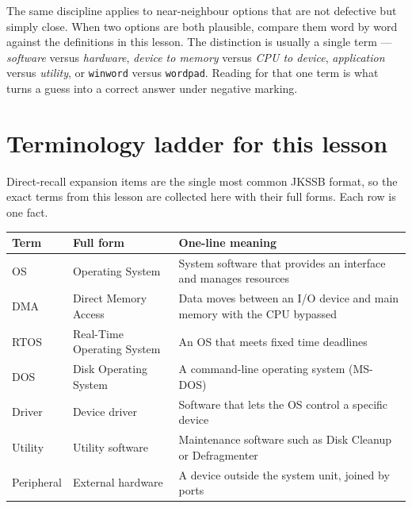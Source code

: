 \documentclass[11pt]{article}
\begin{document}
The same discipline applies to near-neighbour options that are not defective
but simply close. When two options are both plausible, compare them word by
word against the definitions in this lesson. The distinction is usually a
single term --- \emph{software} versus \emph{hardware}, \emph{device to
memory} versus \emph{CPU to device}, \emph{application} versus
\emph{utility}, or \texttt{winword} versus \texttt{wordpad}. Reading for that
one term is what turns a guess into a correct answer under negative marking.

\section{Terminology ladder for this lesson}
Direct-recall expansion items are the single most common JKSSB format, so the
exact terms from this lesson are collected here with their full forms. Each
row is one fact.

\begin{center}
\begin{tabular}{p{}p{}p{}}
\toprule
\textbf{Term} & \textbf{Full form} & \textbf{One-line meaning} \\
\midrule
OS & Operating System & System software that provides an interface and manages resources \\
DMA & Direct Memory Access & Data moves between an I/O device and main memory with the CPU bypassed \\
RTOS & Real-Time Operating System & An OS that meets fixed time deadlines \\
DOS & Disk Operating System & A command-line operating system (MS-DOS) \\
Driver & Device driver & Software that lets the OS control a specific device \\
Utility & Utility software & Maintenance software such as Disk Cleanup or Defragmenter \\
Peripheral & External hardware & A device outside the system unit, joined by ports \\
\bottomrule
\end{tabular}
\end{center}
\end{document}
